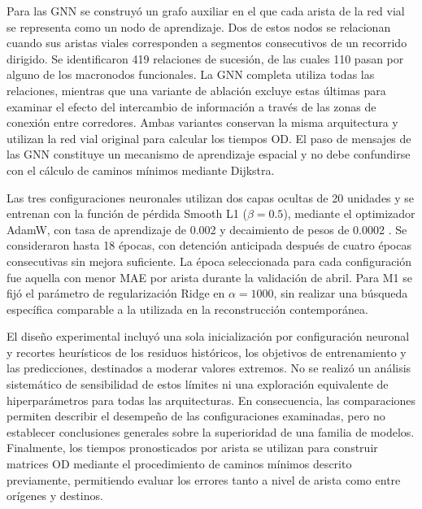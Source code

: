 \documentclass[letterpaper,11pt]{article}
\begin{document}
Para las GNN se construyó un grafo auxiliar en el que cada arista de la red vial se representa como un nodo de aprendizaje. Dos de estos nodos se relacionan cuando sus aristas viales corresponden a segmentos consecutivos de un recorrido dirigido. Se identificaron 419 relaciones de sucesión, de las cuales 110 pasan por alguno de los macronodos funcionales. La GNN completa utiliza todas las relaciones, mientras que una variante de ablación excluye estas últimas para examinar el efecto del intercambio de información a través de las zonas de conexión entre corredores. Ambas variantes conservan la misma arquitectura y utilizan la red vial original para calcular los tiempos OD. El paso de mensajes de las GNN constituye un mecanismo de aprendizaje espacial y no debe confundirse con el cálculo de caminos mínimos mediante Dijkstra.

Las tres configuraciones neuronales utilizan dos capas ocultas de 20 unidades y se entrenan con la función de pérdida Smooth L1 ($\beta=0.5$), mediante el optimizador AdamW, con tasa de aprendizaje de 0.002 y decaimiento de pesos de 0.0002 \parencite{loshchilov2019}. Se consideraron hasta 18 épocas, con detención anticipada después de cuatro épocas consecutivas sin mejora suficiente. La época seleccionada para cada configuración fue aquella con menor MAE por arista durante la validación de abril. Para M1 se fijó el parámetro de regularización Ridge en $\alpha=1000$, sin realizar una búsqueda específica comparable a la utilizada en la reconstrucción contemporánea.

El diseño experimental incluyó una sola inicialización por configuración neuronal y recortes heurísticos de los residuos históricos, los objetivos de entrenamiento y las predicciones, destinados a moderar valores extremos. No se realizó un análisis sistemático de sensibilidad de estos límites ni una exploración equivalente de hiperparámetros para todas las arquitecturas. En consecuencia, las comparaciones permiten describir el desempeño de las configuraciones examinadas, pero no establecer conclusiones generales sobre la superioridad de una familia de modelos. Finalmente, los tiempos pronosticados por arista se utilizan para construir matrices OD mediante el procedimiento de caminos mínimos descrito previamente, permitiendo evaluar los errores tanto a nivel de arista como entre orígenes y destinos.
\end{document}
